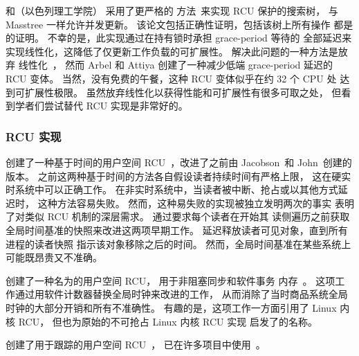 和（以色列理工学院）
采用了更严格的
方法~\cite{MayaArbel2014RCUtree}来实现 RCU 保护的搜索树，
与 Masstree 一样允许并发更新。
该论文包括正确性证明，包括该树上所有操作
都是的证明。
不幸的是，此实现通过在持有锁时承担 grace-period 等待的
全部延迟来实现线性化，这降低了仅更新工作负载的可扩展性。
解决此问题的一种方法是放弃
线性化~\cite{AndreasHaas2012FIFOisnt,PaulEMcKennneyAtomicTreeN4037}，
然而 Arbel 和 Attiya 创建了一种减少低端
grace-period 延迟的 RCU 变体。
当然，没有免费的午餐，这种 RCU 变体似乎在约 32 个 CPU 处
达到可扩展性极限。
虽然放弃线性化以获得性能和可扩展性有很多可取之处，
但看到学者们尝试替代 RCU 实现是非常好的。

\subsubsection{RCU 实现}
\label{sec:defer:RCU Implementations}

创建了一种基于时间的用户空间
RCU~\cite{TimothyLHarris2001}，改进了之前由
Jacobson~\cite{Jacobson93}和 John~\cite{AjuJohn95}创建的版本。
之前这两种基于时间的方法各自假设读者持续时间有严格上限，
这在硬实时系统中可以正确工作。
在非实时系统中，当读者被中断、抢占或以其他方式延迟时，
这种方法容易失败。
然而，这种易失败的实现被独立发明两次的事实
表明了对类似 RCU 机制的深层需求。
通过要求每个读者在开始其
读侧遍历之前获取全局时间基准的快照来改进这两项早期工作。
延迟释放读者可见对象，直到所有进程的读者快照
指示该对象移除之后的时间。
然而，全局时间基准在某些系统上可能既昂贵又不准确。

创建了一种名为的用户空间 RCU，
用于非阻塞同步和软件事务
内存~\cite{KeirAnthonyFraserPhD,UCAM-CL-TR-579,KeirFraser2007withoutLocks}。
这项工作通过用软件计数器替换全局时钟来改进的工作，
从而消除了当时商品系统全局时钟的大部分开销和所有不准确性。
有趣的是，这项工作一方面引用了 Linux 内核 RCU，
但也为原始的不可抢占 Linux 内核 RCU 实现
启发了的名称。

创建了用于跟踪的用户空间
RCU~\cite{MathieuDesnoyers2009URCU,MathieuDesnoyersPhD,MathieuDesnoyers2012URCU,PaulMcKenney2013LWNURCU,PaulMcKenney2013LWNURCUhash,PaulMcKenney2013LWNURCUhashAPI,PaulMcKenney2013LWNURCUqueuestack,PaulMcKenney2013LWNURCUqueuestackAPI,PaulMcKenney2013LWNURCUatomicop,PaulMcKenney2013LWNURCUmenagerie,PaulMcKenney2013LWNURCUAPI,PaulMcKenney2013LWNURCUlist,PaulMcKenney2013LWNURCUmenagerieRCU}，
已在许多项目中使用~\cite{MikeDay2013RCUqemu}。

